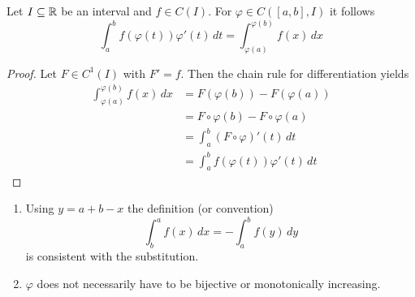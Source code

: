 \begin{lemma}
    Let \( I \subseteq \mathbb{R} \) be an interval and \( f \in C(I) \). For \( \varphi \in C([a,b], I) \) it follows
    \[
        \int_{a}^{b} f(\varphi(t))\varphi'(t)\,dt = \int_{\varphi(a)}^{\varphi(b)} f(x)\,dx
    \]
\end{lemma}
\begin{proof}
    Let \( F \in C^1(I) \) with \( F' = f \). Then the chain rule for differentiation yields
    \[
        \begin{split}
            \int_{\varphi(a)}^{\varphi(b)} f(x)\,dx
            &= F(\varphi(b)) - F(\varphi(a)) \\
            &= F\circ\varphi(b) - F\circ\varphi(a) \\
            &= \int_{a}^{b} (F\circ\varphi)'(t)\,dt \\
            &= \int_{a}^{b} f(\varphi(t))\varphi'(t)\,dt
        \end{split}
    \]
\end{proof}
\bigskip

\begin{remarks}\hfill
    \begin{enumerate}
        \item Using \( y = a + b - x \) the definition (or convention)
              \[
                  \int_b^a f(x)\,dx = - \int_a^b f(y)\,dy
              \]
              is consistent with the substitution.
        \item \( \varphi \) does not necessarily have to be bijective or monotonically increasing.
    \end{enumerate}
\end{remarks}
\bigskip


